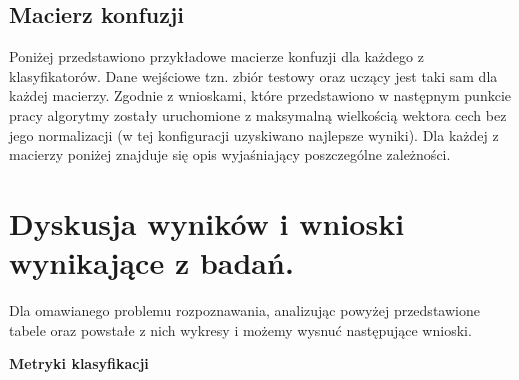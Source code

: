 \documentclass[12pt]{article}
\begin{document}
\subsection{Macierz konfuzji}
\indent Poniżej przedstawiono przykładowe macierze konfuzji dla każdego z klasyfikatorów. Dane wejściowe tzn. zbiór testowy oraz uczący jest taki sam dla każdej macierzy. Zgodnie z wnioskami, które przedstawiono w następnym punkcie pracy algorytmy zostały uruchomione z maksymalną wielkością wektora cech bez jego normalizacji (w tej konfiguracji uzyskiwano najlepsze wyniki). Dla każdej z macierzy poniżej znajduje się opis wyjaśniający poszczególne zależności.




\newpage
\section{Dyskusja wyników i wnioski wynikające z badań.}

\indent Dla omawianego problemu rozpoznawania, analizując powyżej przedstawione tabele oraz powstałe z nich wykresy i możemy wysnuć następujące wnioski.\\

\centerline{\textbf{Metryki klasyfikacji }}
\end{document}

